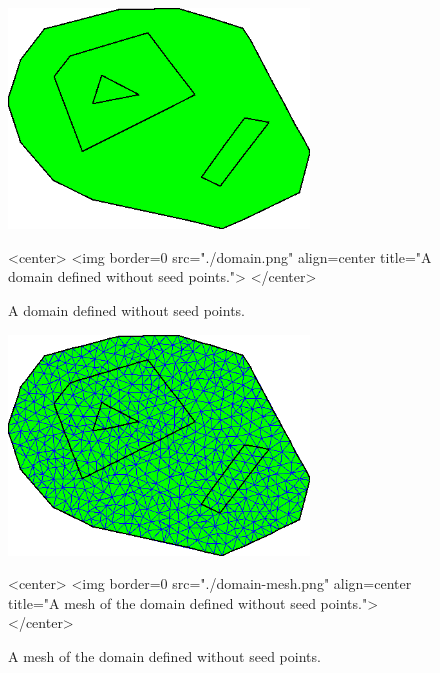 \begin{figure}[htbp]
\begin{ccTexOnly}
\begin{center}
\includegraphics[width=8cm]{Mesh_2/domain}
\end{center}
\end{ccTexOnly}
\caption{A domain defined without seed points.}
\label{Domain}

\begin{ccHtmlOnly}
<center>
<img border=0 src="./domain.png"
     align=center title="A domain defined without seed points.">
</center>
\end{ccHtmlOnly}
\end{figure}

\begin{figure}[htbp]
\begin{ccTexOnly}
\begin{center}
\includegraphics[width=8cm]{Mesh_2/domain-mesh}
\end{center}
\end{ccTexOnly}
\caption{A mesh of the domain defined without seed points.}
\label{Domain-mesh}

\begin{ccHtmlOnly}
<center>
<img border=0 src="./domain-mesh.png"
     align=center title="A mesh of the domain defined without seed points.">
</center>
\end{ccHtmlOnly}
\end{figure}

